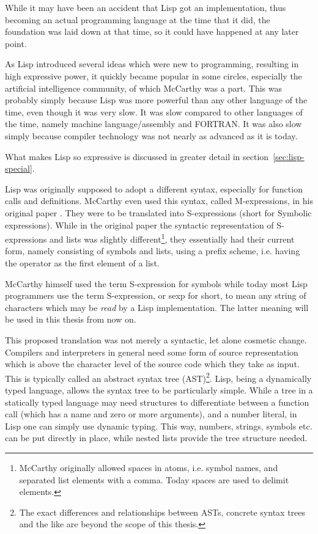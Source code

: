 \documentclass[a4paper,10pt,twoside]{report}
\begin{document}
While it may have been an accident that Lisp got an implementation, thus
becoming an actual programming language at the time that it did, the foundation
was laid down at that time, so it could have happened at any later point.

As Lisp introduced several ideas which were new to programming, resulting in
high expressive power, it quickly became popular in some circles, especially the
artificial intelligence community, of which McCarthy was a part.  This was
probably simply because Lisp was more powerful than any other language of the
time, even though it was very slow.  It was slow compared to other languages of
the time, namely machine language/assembly and FORTRAN.  It was also slow simply
because compiler technology was not nearly as advanced as it is today.

What makes Lisp so expressive is discussed in greater detail in
section~\ref{sec:lisp-special}.

Lisp was originally supposed to adopt a different syntax, especially for
function calls and definitions.  McCarthy even used this syntax, called
M-expressions, in his original paper \cite{rec-fun-sym-expr}.  They were to be
translated into S-expressions (short for Symbolic expressions).  While in the
original paper the syntactic representation of S-expressions and lists was
slightly different\footnote{McCarthy originally allowed spaces in atoms,
  i.e. symbol names, and separated list elements with a comma.  Today spaces are
  used to delimit elements.}, they essentially had their current form, namely
consisting of symbols and lists, using a prefix scheme, i.e. having the operator
as the first element of a list.

McCarthy himself used the term S-expression for symbols while today most Lisp
programmers use the term S-expression, or sexp for short, to mean any string of
characters which may be \emph{read} by a Lisp implementation.  The latter
meaning will be used in this thesis from now on.

This proposed translation was not merely a syntactic, let alone cosmetic change.
Compilers and interpreters in general need some form of source representation
which is above the character level of the source code which they take as input.
This is typically called an abstract syntax tree (AST)\footnote{The exact
  differences and relationships between ASTs, concrete syntax trees and the like
  are beyond the scope of this thesis.}.  Lisp, being a dynamically typed
language, allows the syntax tree to be particularly simple.  While a tree in a
statically typed language may need structures to differentiate between a
function call (which has a name and zero or more arguments), and a number
literal, in Lisp one can simply use dynamic typing.  This way, numbers, strings,
symbols etc. can be put directly in place, while nested lists provide the tree
structure needed.
\end{document}
